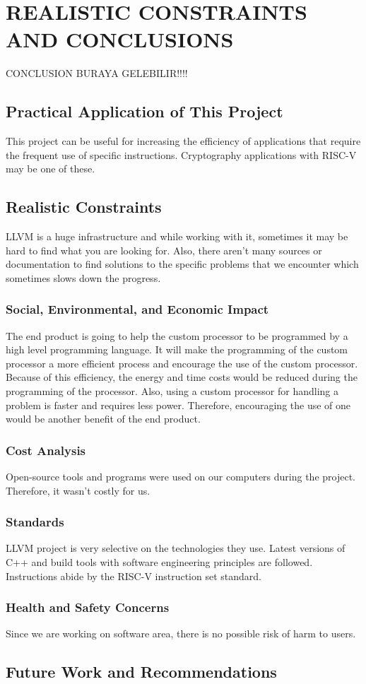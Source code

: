 \chapter{REALISTIC CONSTRAINTS AND CONCLUSIONS}\label{Ch6}

CONCLUSION BURAYA GELEBILIR!!!!

\section{Practical Application of This Project}
This project can be useful for increasing the efficiency of applications that require the frequent use of specific instructions. Cryptography applications with RISC-V may be one of these.

\section{Realistic Constraints}
LLVM is a huge infrastructure and while working with it, sometimes it may be hard to find what you are looking for. Also, there aren’t many sources or documentation to find solutions to the specific problems that we encounter which sometimes slows down the progress.

\subsection{Social, Environmental, and Economic Impact}
The end product is going to help the custom processor to be programmed by a high level programming language. It will make the programming of the custom processor a more efficient process and encourage the use of the custom processor. Because of this efficiency, the energy and time costs would be reduced during the programming of the processor. Also, using a custom processor for handling a problem is faster and requires less power. Therefore, encouraging the use of one would be another benefit of the end product.

\subsection{Cost Analysis}
Open-source tools and programs were used on our computers during the project. Therefore, it wasn’t costly for us.

\subsection{Standards}
LLVM project is very selective on the technologies they use. Latest versions of C++ and build tools with software engineering principles are followed. Instructions abide by the RISC-V instruction set standard.

\subsection{Health and Safety Concerns}
Since we are working on software area, there is no possible risk of harm to users.

\section{Future Work and Recommendations}
